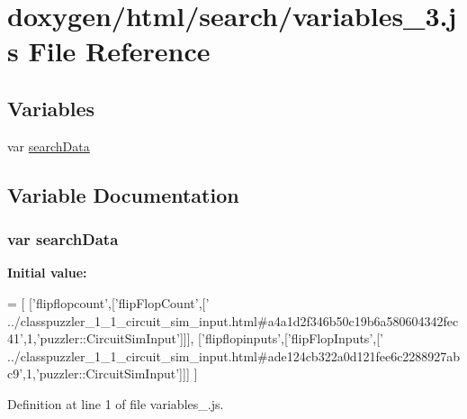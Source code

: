 \hypertarget{a00107}{}\section{doxygen/html/search/variables\+\_\+3.js File Reference}
\label{a00107}
\subsection*{Variables}
\begin{DoxyCompactItemize}
\item 
var \hyperlink{a00107_ad01a7523f103d6242ef9b0451861231e}{search\+Data}
\end{DoxyCompactItemize}


\subsection{Variable Documentation}
\hypertarget{a00107_ad01a7523f103d6242ef9b0451861231e}{}
\subsubsection[{search\+Data}]{\setlength{\rightskip}{0pt plus 5cm}var search\+Data}\label{a00107_ad01a7523f103d6242ef9b0451861231e}
{\bfseries Initial value\+:}
\begin{DoxyCode}
=
[
  [\textcolor{stringliteral}{'flipflopcount'},[\textcolor{stringliteral}{'flipFlopCount'},[\textcolor{stringliteral}{'
      ../classpuzzler\_1\_1\_circuit\_sim\_input.html#a4a1d2f346b50c19b6a580604342fec41'},1,\textcolor{stringliteral}{'puzzler::CircuitSimInput'}]]],
  [\textcolor{stringliteral}{'flipflopinputs'},[\textcolor{stringliteral}{'flipFlopInputs'},[\textcolor{stringliteral}{'
      ../classpuzzler\_1\_1\_circuit\_sim\_input.html#ade124cb322a0d121fee6c2288927abc9'},1,\textcolor{stringliteral}{'puzzler::CircuitSimInput'}]]]
]
\end{DoxyCode}


Definition at line 1 of file variables\+\_.\+js.

